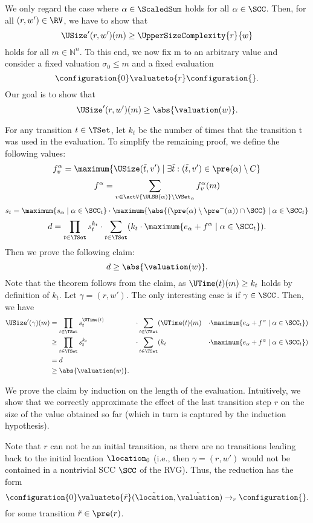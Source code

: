 We only regard the case where $\alpha \in \ScaledSum$ holds for all $\alpha \in \SCC$.
Then, for all $(r, w') \in \RV$, we have to show that
\[ \USize'(r, w')(m) \geq \UpperSizeComplexity{r}{w} \]
holds for all $m \in \mathbb{N}^n$.
To this end, we now fix m to an arbitrary value and consider a fixed valuation $\sigma_0 \leq m$ and a fixed evaluation
\[ \configuration{0} \valuateto{r} \configuration{}. \]
Our goal is to show that
\[ \USize'(r, w')(m) \geq \abs{\valuation(w)}. \]

For any transition $t \in \TSet$, let $k_t$ be the number of times that the transition t was used in the evaluation.
To simplify the remaining proof, we define the following values:
\[ f^\alpha_v = \maximum{\USize(\tilde{t}, v') \mid \exists \tilde{t}: (\tilde{t}, v') \in \pre(\alpha) \setminus C} \]
\[ f^\alpha = \sum_{v \in \actV{\ULSB(\alpha)} \setminus \VSet_\alpha} f^\alpha_v(m) \]
\[ s_t = \maximum{s_{\alpha} \mid \alpha \in \SCC_t} \cdot \maximum{\abs{(\pre(\alpha) \setminus \pre^-(\alpha)) \cap \SCC} \mid \alpha \in \SCC_t} \]
\[ d = \prod_{t \in \TSet} s^{k_t}_t \cdot \sum_{t \in \TSet} (k_t \cdot \maximum{e_\alpha + f^\alpha \mid \alpha \in \SCC_t}). \]
Then we prove the following claim:
\[ d \geq \abs{\valuation(w)}. \]
Note that the theorem follows from the claim, as $\UTime(t)(m) \geq k_t$ holds by definition of $k_t$.
Let $\gamma = (r, w')$.
The only interesting case is if $\gamma \in \SCC$.
Then, we have
\begin{align*}
  \USize'(\gamma)(m) &= \prod_{t \in \TSet} s_t^{\UTime(t)} & \cdot \sum_{t \in \TSet} (& \UTime(t)(m) & \cdot \maximum{ e_\alpha + f^\alpha \mid \alpha \in \SCC_t }) \\
  & \geq \prod_{t \in \TSet} s_t^{k_t} & \cdot \sum_{t \in \TSet} (& k_t & \cdot \maximum{ e_\alpha + f^\alpha \mid \alpha \in \SCC_t }) \\
  &= d \\
  & \geq \abs{\valuation(w)}.
\end{align*}

We prove the claim by induction on the length of the evaluation.
Intuitively, we show that we correctly approximate the effect of the last transition step $r$ on the size of the value obtained so far (which in turn is captured by the induction hypothesis).

Note that $r$ can not be an initial transition, as there are no transitions leading back to the initial location $\location_0$
(i.e., then $\gamma = (r, w')$ would not be contained in a nontrivial SCC $\SCC$ of the RVG).
Thus, the reduction has the form
\[ \configuration{0} \valuateto{\tilde{r}} (\tilde{\location}, \tilde{\valuation}) \rightarrow_r \configuration{}. \]
for some transition $\tilde{r} \in \pre(r)$.

